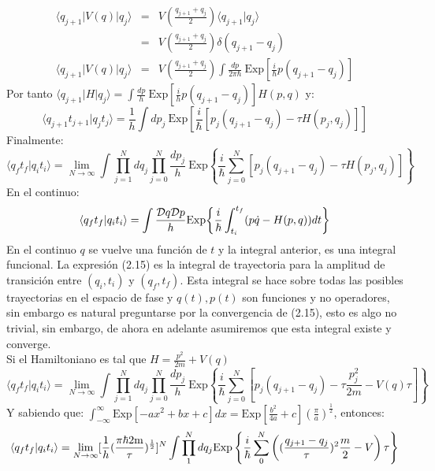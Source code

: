 \begin{eqnarray}
\nonumber \langle q_{j+1}|V(q)|q_j \rangle &=& V(\frac{q_{j+1}+q_j}{2})\langle q_{j+1}|q_j\rangle\\
\nonumber &=& V(\frac{q_{j+1}+q_j}{2})\delta(q_{j+1}-q_j)\\
\langle q_{j+1}|V(q)|q_j \rangle &=& V(\frac{q_{j+1}+q_j}{2})\int \frac{dp}{2\pi\hbar}\ \text{Exp}[\frac{i}{\hbar}p(q_{j+1}-q_j)]
\end{eqnarray}
Por tanto $\langle q_{j+1}|H|q_j\rangle=\int \frac{dp}{h}\ \text{Exp}[\frac{i}{h}p(q_{j+1}-q_j)]H(p,q)$ y:
\begin{equation}
\langle q_{j+1}t_{j+1}|q_jt_j\rangle=\frac{1}{h}\int dp_j\ \text{Exp}[\frac{i}{\hbar}[p_j(q_{j+1}-q_j)-\tau H(p_j,q_j)]]
\end{equation}
Finalmente:
\begin{equation}
\langle q_{f}t_{f}|q_it_i\rangle=\lim_{N \to \infty}\int\prod_{j=1}^{N}dq_j\prod_{j=0}^{N}\frac{dp_j}{h}\ \text{Exp}\left\{ \frac{i}{\hbar}\sum_{j=0}^{N}[p_{j}(q_{j+1}-q_{j})-\tau H(p_{j},q_{j})]\right\}
\end{equation}
En el continuo:
\begin{equation}
\langle q_{f}t_{f}|q_it_i\rangle=\int\frac{\mathcal{D}q\mathcal{D}p}{h}\text{Exp\ensuremath{\left\{ \frac{i}{\hbar}\int_{t_{i}}^{t_{f}}(p\dot{q}-H(p,q))dt\right\} }}
\end{equation}
En el continuo $q$ se vuelve una función de $t$ y la integral anterior, es una integral funcional. La expresión (2.15) es la integral de trayectoria para la amplitud de transición entre $(q_i,t_i)$ y $(q_f,t_f)$. Esta integral se hace sobre todas las posibles trayectorias en el espacio de fase y $q(t), p(t)$ son funciones y no operadores, sin embargo es natural preguntarse por la convergencia de (2.15), esto es algo no trivial, sin embargo, de ahora en adelante asumiremos que esta integral existe y converge. 	
\\
Si el Hamiltoniano es tal que $H=\frac{p^2}{2m}+V(q)$
\begin{equation}
\langle q_{f}t_{f}|q_it_i\rangle=\lim_{N \to \infty}\int\prod_{j=1}^{N}dq_j\prod_{j=0}^{N}\frac{dp_j}{h}\ \text{Exp}\left\{ \frac{i}{\hbar}\sum_{j=0}^{N}[p_{j}(q_{j+1}-q_{j})-\tau \frac{p_j^2}{2m}-V(q)\tau]\right\}
\end{equation}
Y sabiendo que: $\int_{-\infty}^{\infty}\text{Exp}[-ax^{2}+bx+c]dx=\text{Exp}[\frac{b^{2}}{4a}+c](\frac{\pi}{a})^{\frac{1}{2}}$, entonces:
\begin{equation}
\langle q_{f}t_{f}|q_it_i\rangle=\lim_{N\to\infty}[\frac{1}{h}(\frac{\text{\ensuremath{\pi\hbar}2m}}{\tau})^{\frac{1}{2}}]^{N}\int\prod_{1}^{N}dq_{j}\text{Exp}\left\{ \frac{i}{\hbar}\sum_{0}^{N}\left((\frac{q_{j+1}-q_{j}}{\tau})^{2}\frac{m}{2}-V\right)\tau\right\} 
\end{equation}
